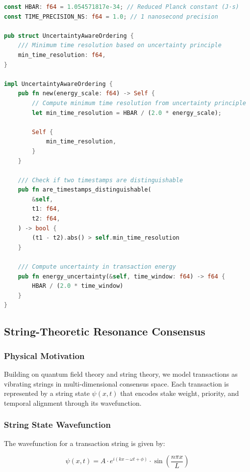 \documentclass[11pt,a4paper]{article}
\begin{document}
\begin{lstlisting}[language=Rust, caption=Uncertainty-Aware Transaction Ordering]
const HBAR: f64 = 1.054571817e-34; // Reduced Planck constant (J·s)
const TIME_PRECISION_NS: f64 = 1.0; // 1 nanosecond precision

pub struct UncertaintyAwareOrdering {
    /// Minimum time resolution based on uncertainty principle
    min_time_resolution: f64,
}

impl UncertaintyAwareOrdering {
    pub fn new(energy_scale: f64) -> Self {
        // Compute minimum time resolution from uncertainty principle
        let min_time_resolution = HBAR / (2.0 * energy_scale);

        Self {
            min_time_resolution,
        }
    }

    /// Check if two timestamps are distinguishable
    pub fn are_timestamps_distinguishable(
        &self,
        t1: f64,
        t2: f64,
    ) -> bool {
        (t1 - t2).abs() > self.min_time_resolution
    }

    /// Compute uncertainty in transaction energy
    pub fn energy_uncertainty(&self, time_window: f64) -> f64 {
        HBAR / (2.0 * time_window)
    }
}
\end{lstlisting}

\subsection{String-Theoretic Resonance Consensus}

\subsubsection{Physical Motivation}

Building on quantum field theory and string theory, we model transactions as vibrating strings in multi-dimensional consensus space. Each transaction is represented by a string state $\psi(x,t)$ that encodes stake weight, priority, and temporal alignment through its wavefunction.

\subsubsection{String State Wavefunction}

The wavefunction for a transaction string is given by:

\begin{equation}
\psi(x,t) = A \cdot e^{i(kx - \omega t + \phi)} \cdot \sin\left(\frac{n\pi x}{L}\right)
\label{eq:string-wavefunction}
\end{equation}
\end{document}
